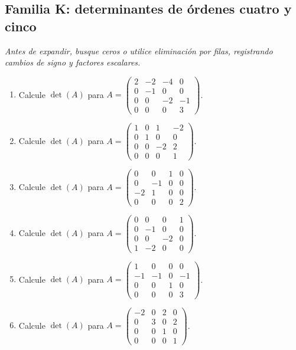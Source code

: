 \documentclass[12pt]{article}
\theoremstyle{remark}
\newcounter{contadorEjercicio}
\newenvironment{listaejercicios}{\begin{enumerate}[label=\textbf{E\arabic*.},leftmargin=2.4em,itemsep=0.52em]\setcounter{enumi}{\value{contadorEjercicio}}}{\setcounter{contadorEjercicio}{\value{enumi}}\end{enumerate}}
\begin{document}
\subsection{Familia K: determinantes de órdenes cuatro y cinco}\noindent\textit{Antes de expandir, busque ceros o utilice eliminación por filas, registrando cambios de signo y factores escalares.}\par\medskip
\begin{listaejercicios}

\item Calcule $\det(A)$ para $A=\begin{pmatrix}2&-2&-4&0\\0&-1&0&0\\0&0&-2&-1\\0&0&0&3\end{pmatrix}$.

\item Calcule $\det(A)$ para $A=\begin{pmatrix}1&0&1&-2\\0&1&0&0\\0&0&-2&2\\0&0&0&1\end{pmatrix}$.

\item Calcule $\det(A)$ para $A=\begin{pmatrix}0&0&1&0\\0&-1&0&0\\-2&1&0&0\\0&0&0&2\end{pmatrix}$.

\item Calcule $\det(A)$ para $A=\begin{pmatrix}0&0&0&1\\0&-1&0&0\\0&0&-2&0\\1&-2&0&0\end{pmatrix}$.

\item Calcule $\det(A)$ para $A=\begin{pmatrix}1&0&0&0\\-1&-1&0&-1\\0&0&1&0\\0&0&0&3\end{pmatrix}$.

\item Calcule $\det(A)$ para $A=\begin{pmatrix}-2&0&2&0\\0&3&0&2\\0&0&1&0\\0&0&0&1\end{pmatrix}$.


\end{listaejercicios}
\end{document}
